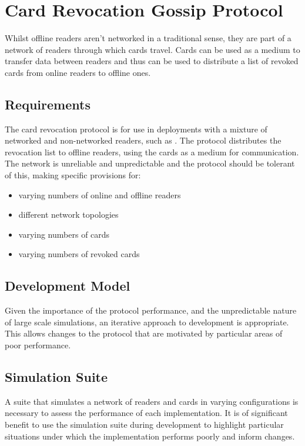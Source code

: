 \documentclass[dissertation.tex]{subfiles}
\begin{document}
  \section{Card Revocation Gossip Protocol}
  Whilst offline readers aren't networked in a traditional sense, they are part of a network of readers through which cards travel. Cards can be used as a medium to transfer data between readers and thus can be used to distribute a list of revoked cards from online readers to offline ones.

  \subsection{Requirements}
  The card revocation protocol is for use in deployments with a mixture of networked and non-networked readers, such as \UoC{}. The protocol distributes the revocation list to offline readers, using the cards as a medium for communication. The network is unreliable and unpredictable and the protocol should be tolerant of this, making specific provisions for:

  \begin{itemize}
    \item varying numbers of online and offline readers
    \item different network topologies
    \item varying numbers of cards
    \item varying numbers of revoked cards
  \end{itemize}

  \subsection{Development Model}
  Given the importance of the protocol performance, and the unpredictable nature of large scale simulations, an iterative approach to development is appropriate. This allows changes to the protocol that are motivated by particular areas of poor performance.

  \subsection{Simulation Suite}
  A suite that simulates a network of readers and cards in varying configurations is necessary to assess the performance of each implementation. It is of significant benefit to use the simulation suite during development to highlight particular situations under which the implementation performs poorly and inform changes.
\end{document}
